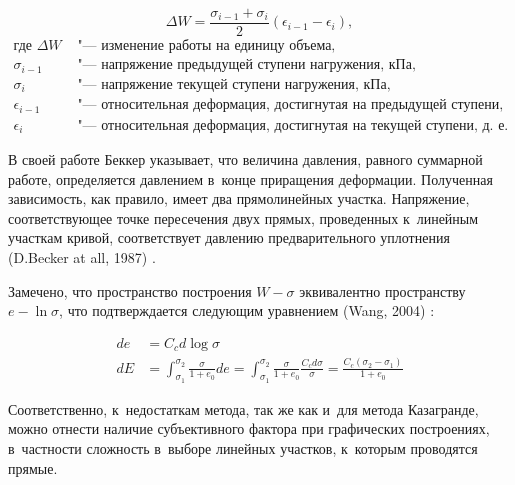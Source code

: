 \begin{equation}
  \label{eq:deltaw}
  \Delta W = \frac{\sigma_{i-1} + \sigma_i}{2} (\epsilon_{i-1} - \epsilon_i),
\end{equation}
\begin{align*}
  \text{где }
  \Delta W & 
  \text{ "--- изменение работы на единицу объема,} \\
  \sigma_{i-1} & 
  \text{ "--- напряжение предыдущей ступени нагружения, кПа,} \\
  \sigma_i & 
  \text{ "--- напряжение текущей ступени нагружения, кПа,} \\
  \epsilon_{i-1} & 
  \text{ "--- относительная деформация, достигнутая на предыдущей ступени, д.~е.,} \\
  \epsilon_i & 
  \text{ "--- относительная деформация, достигнутая на текущей ступени, д.~е.}
\end{align*}

В своей работе Беккер указывает, что величина давления, равного суммарной работе, определяется давлением в~конце приращения деформации. 
Полученная зависимость, как правило, имеет два прямолинейных участка. 
Напряжение, соответствующее точке пересечения двух прямых, проведенных к~линейным участкам кривой, соответствует давлению предварительного уплотнения (D.Becker at all, 1987) \cite{becker1987}.

Замечено, что пространство построения $W - \sigma$ эквивалентно пространству $e - \ln \sigma$, что подтверждается следующим уравнением (Wang, 2004) \cite{wang2004}: 


\begin{subequations}
  \label{eq:Maxwell}
  \begin{align}
    \label{eq:eqw_1}
    de & = C_c d \log\sigma \\
    \label{eq:eqw_2}
    dE & = \int_{\sigma_1}^{\sigma_2} \frac{\sigma}{1+e_0} de 
    = \int_{\sigma_1}^{\sigma_2} \frac{\sigma}{1+e_0} \frac{C_c d\sigma}{\sigma}
    = \frac{C_c (\sigma_2-\sigma_1)}{1+e_0}
  \end{align}
\end{subequations}

Соответственно, к~недостаткам метода, так же как и~для метода Казагранде, можно отнести наличие субъективного фактора при графических построениях, в~частности сложность в~выборе линейных участков, к~которым проводятся прямые.


 

